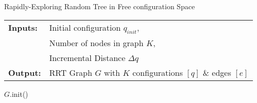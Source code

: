 \bigskip
\begin{algorithm}[H]
    \caption{Rapidly-Exploring Random Tree in Free \gls{configuration} Space}
    \SetAlgoLined
    \begin{tabular}{l l}
    \textbf{Inputs:}    & Initial \gls{configuration} $q_{init}$,\\ 
                        & Number of nodes in graph $K$, \\
                        & Incremental Distance $\Delta q$ \\
    \textbf{Output:}    & RRT Graph $G$ with $K$ \gls{configuration}s $[q]$ \& edges $[e]$ \\
    \end{tabular}

        $G$.init()\;
\label{algorithm:rrt}
\end{algorithm}
\bigskip